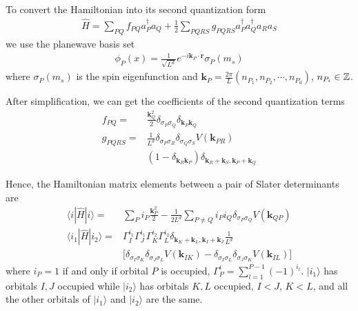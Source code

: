 \documentclass[%
reprint,
 superscriptaddress,
 amsmath,amssymb,
 aps,
]{revtex4-1}
\def\beq{\begin{eqnarray}}
\def\eeq{\end{eqnarray}}
\begin{document}
To convert the Hamiltonian into its second quantization form
\beq
\hat{H}=\sum_{PQ}f_{PQ}a_P^\dag a_Q+\frac{1}{2}\sum_{PQRS}g_{PQRS}a_P^\dag a_Q^\dag a_Ra_S
\eeq
we use the planewave basis set
\beq
\phi_P(x)=\frac{1}{\sqrt{L^d}}e^{-i\mathbf{k}_P\cdot\mathbf{r}}\sigma_P(m_s)
\eeq
where $\sigma_P(m_s)$ is the spin eigenfunction and $\mathbf{k}_P=\frac{2\pi}{L}(n_{P_1}, n_{P_2},\cdots, n_{P_d})$, $n_{P_i}\in\Bbb{Z}$.

After simplification, we can get the coefficients of the second quantization terms
\begin{align*}
f_{PQ}= & \frac{\mathbf{k}_Q^2}{2}\delta_{\sigma_P\sigma_Q}\delta_{\mathbf{k}_P\mathbf{k}_Q}\\
g_{PQRS}= & \frac{1}{L^d}\delta_{\sigma_P\sigma_R}\delta_{\sigma_Q\sigma_S}V(\mathbf{k}_{PR})\\
& (1-\delta_{\mathbf{k}_R\mathbf{k}_P})\delta_{\mathbf{k}_R+\mathbf{k}_S,\mathbf{k}_P+\mathbf{k}_Q}
\end{align*}

Hence, the Hamiltonian matrix elements between a pair of Slater determinants are
\begin{align*}
\langle i|\hat{H}|i\rangle  = & \sum_{P}i_P\frac{\mathbf{k}_P^2}{2}-\frac{1}{2L^d}\sum_{P\ne Q}i_Pi_Q\delta_{\sigma_P\sigma_Q}V(\mathbf{k}_{QP})\\
\langle i_1|\hat{H}|i_2\rangle  = &  \Gamma_I^{i_1}\Gamma_J^{i_1}\Gamma_K^{i_2}\Gamma_L^{i_2}\delta_{\mathbf{k}_K+\mathbf{k}_L,\mathbf{k}_I+\mathbf{k}_J}\frac{1}{L^d}\\
&  \lbrack\delta_{\sigma_I\sigma_K}\delta_{\sigma_J\sigma_L}V(\mathbf{k}_{IK})-\delta_{\sigma_I\sigma_L}\delta_{\sigma_J\sigma_K}V(\mathbf{k}_{IL})\rbrack
\end{align*}
where $i_P=1$ if and only if orbital $P$ is occupied, $\Gamma_P^i=\sum_{l=1}^{P-1}(-1)^{i_l}$. $|i_1\rangle$ has orbitals $I,J$ occupied while $|i_2\rangle$ has orbitals $K,L$ occupied, $I<J$, $K<L$, and all the other orbitals of $|i_1\rangle$ and $|i_2\rangle$ are the same.

%
%

\end{document}
